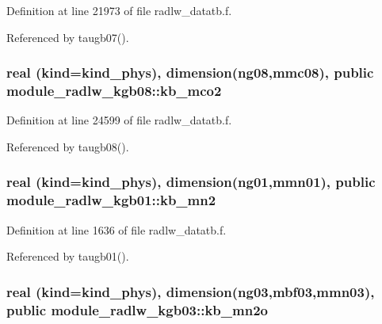 Definition at line 21973 of file radlw\+\_\+datatb.\+f.



Referenced by taugb07().

\subsubsection[{\texorpdfstring{kb\+\_\+mco2}{kb_mco2}}]{\setlength{\rightskip}{0pt plus 5cm}real (kind=kind\+\_\+phys), dimension(ng08,mmc08), public module\+\_\+radlw\+\_\+kgb08\+::kb\+\_\+mco2}\hypertarget{group__module__radlw__main_ga9a85770aee1b88b9323d9466c1772ec4}{}\label{group__module__radlw__main_ga9a85770aee1b88b9323d9466c1772ec4}


Definition at line 24599 of file radlw\+\_\+datatb.\+f.



Referenced by taugb08().

\subsubsection[{\texorpdfstring{kb\+\_\+mn2}{kb_mn2}}]{\setlength{\rightskip}{0pt plus 5cm}real (kind=kind\+\_\+phys), dimension(ng01,mmn01), public module\+\_\+radlw\+\_\+kgb01\+::kb\+\_\+mn2}\hypertarget{group__module__radlw__main_gac357df5f66a7e384e22db58203ac294a}{}\label{group__module__radlw__main_gac357df5f66a7e384e22db58203ac294a}


Definition at line 1636 of file radlw\+\_\+datatb.\+f.



Referenced by taugb01().

\subsubsection[{\texorpdfstring{kb\+\_\+mn2o}{kb_mn2o}}]{\setlength{\rightskip}{0pt plus 5cm}real (kind=kind\+\_\+phys), dimension(ng03,mbf03,mmn03), public module\+\_\+radlw\+\_\+kgb03\+::kb\+\_\+mn2o}\hypertarget{group__module__radlw__main_gaa2442e663e83b222648a86a34cd6631c}{}\label{group__module__radlw__main_gaa2442e663e83b222648a86a34cd6631c}


